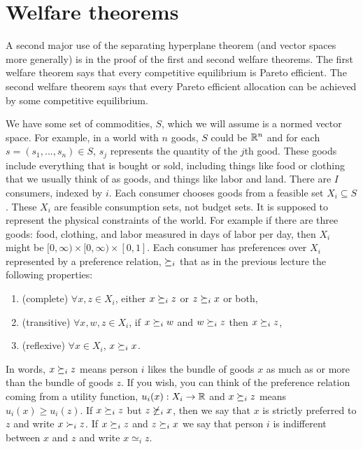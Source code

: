 \section{Welfare theorems}
A second major use of the separating hyperplane theorem (and vector
spaces more generally) is in the proof of the first and second welfare
theorems. The first welfare theorem says that every competitive
equilibrium is Pareto efficient. The second welfare theorem says that every
Pareto efficient allocation can be achieved by some competitive
equilibrium. 

We have some set of commodities, $S$, which we will assume is a normed
vector space. For example, in a world with $n$ goods, $S$ could be
$\mathbb{R}^n$ and for each $s = (s_1,...,s_n) \in S$, $s_j$ represents the
quantity of the $j$th good. These goods include everything that is
bought or sold, including things like food or clothing that we usually
think of as goods, and things like labor and land. There are $I$
consumers, indexed by $i$. Each consumer chooses goods from a feasible
set $X_i \subseteq S$. These $X_i$ are feasible consumption sets, not
budget sets. It is supposed to represent the physical constraints of
the world. For example if there are three goods: food, clothing, and labor
measured in days of labor per day, then $X_i$ might be $[0, \infty)
\times [0,\infty) \times [0, 1]$.  Each consumer has preferences over
$X_i$ represented by a preference relation, $\succeq_i$ that as in the
previous lecture the following properties:
\begin{enumerate}
\item (complete) $\forall x, z \in X_i$, either $x \succeq_i z$ or $z
  \succeq_i x$ or both,
\item (transitive) $\forall x, w, z \in X_i$, if $x \succeq_i w$ and $w
  \succeq_i z$ then $x \succeq_i z$,
\item (reflexive) $\forall x \in X_i$, $x \succeq_i x$.
\end{enumerate}
In words, $x \succeq_i z$ means person $i$ likes the bundle of goods $x$
as much as or more than the bundle of goods $z$. If you wish, you can
think of the preference relation coming from a utility function,
$u_i(x) : X_i \rightarrow \mathbb{R}$ and $x \succeq_i z$ means $u_i(x) \geq
u_i(z)$.  If $x \succeq_i z$ but $z \not\succeq_i x$, then we say that
$x$ is strictly preferred to $z$ and write $x \succ_i z$. If $x
\succeq_i z$ and $z \succeq_i x$ we say that person $i$ is indifferent
between $x$ and $z$ and write $x \simeq_i z$.


